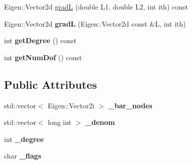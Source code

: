 \begin{DoxyCompactItemize}
\item 
Eigen::Vector2d \hyperlink{class_shape_function_3_01_simplex_3_012_01_4_01_4_a208cf52a358198dfabbb0844860f170a}{gradL} (double L1, double L2, int ith) const 
\item 
\hypertarget{class_shape_function_3_01_simplex_3_012_01_4_01_4_a6ac03dc0bcfec575b4e331e6ee8b1963}{
Eigen::Vector2d {\bfseries gradL} (Eigen::Vector2d const \&L, int ith)}
\label{class_shape_function_3_01_simplex_3_012_01_4_01_4_a6ac03dc0bcfec575b4e331e6ee8b1963}

\item 
\hypertarget{class_shape_function_3_01_simplex_3_012_01_4_01_4_a32288fd5d40c4131c4ac9b406b1efc2f}{
int {\bfseries getDegree} () const }
\label{class_shape_function_3_01_simplex_3_012_01_4_01_4_a32288fd5d40c4131c4ac9b406b1efc2f}

\item 
\hypertarget{class_shape_function_3_01_simplex_3_012_01_4_01_4_aec32386ff8711c5388334ba1f6ba534e}{
int {\bfseries getNumDof} () const }
\label{class_shape_function_3_01_simplex_3_012_01_4_01_4_aec32386ff8711c5388334ba1f6ba534e}

\end{DoxyCompactItemize}
\subsection*{Public Attributes}
\begin{DoxyCompactItemize}
\item 
\hypertarget{class_shape_function_3_01_simplex_3_012_01_4_01_4_a194fe274c89c885d30fe081569c93569}{
std::vector$<$ Eigen::Vector2i $>$ {\bfseries \_\-bar\_\-nodes}}
\label{class_shape_function_3_01_simplex_3_012_01_4_01_4_a194fe274c89c885d30fe081569c93569}

\item 
\hypertarget{class_shape_function_3_01_simplex_3_012_01_4_01_4_a784abf95e968a6290cc438482425b348}{
std::vector$<$ long int $>$ {\bfseries \_\-denom}}
\label{class_shape_function_3_01_simplex_3_012_01_4_01_4_a784abf95e968a6290cc438482425b348}

\item 
\hypertarget{class_shape_function_3_01_simplex_3_012_01_4_01_4_a2b1f6a76d22f9d725a4fda78f59f3bef}{
int {\bfseries \_\-degree}}
\label{class_shape_function_3_01_simplex_3_012_01_4_01_4_a2b1f6a76d22f9d725a4fda78f59f3bef}

\item 
\hypertarget{class_shape_function_3_01_simplex_3_012_01_4_01_4_a5ecbe73eebf7caea35675d37062626f3}{
char {\bfseries \_\-flags}}
\label{class_shape_function_3_01_simplex_3_012_01_4_01_4_a5ecbe73eebf7caea35675d37062626f3}

\end{DoxyCompactItemize}


